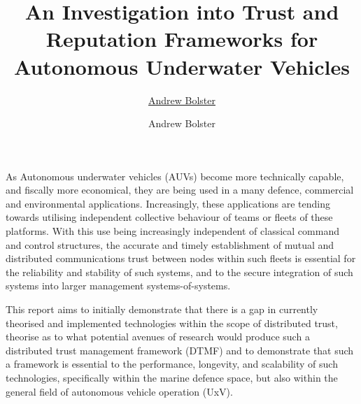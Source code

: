 \documentclass[twoside,10pt,a4paper]{Latex/Classes/PhDthesisPSnPDF}
\title{An Investigation into Trust and Reputation Frameworks for Autonomous Underwater Vehicles}
\author{\href{mailto:me@andrewbolster.info}{Andrew Bolster}}
\author{Andrew Bolster}
\begin{document}

\renewcommand\baselinestretch{1}



\maketitle  %



\begin{abstracts}        %
As Autonomous underwater vehicles (AUVs) become more technically capable, and
fiscally more economical, they are being used in a many defence, commercial and
environmental applications. Increasingly, these applications are tending towards
utilising  independent collective behaviour of teams or fleets of these
platforms. With this use being increasingly independent of classical command and
control structures, the accurate and timely establishment of mutual and
distributed communications trust between nodes within such fleets is essential
for the reliability and stability of such systems, and to the secure integration
of such systems into larger management systems-of-systems. 

This report aims to initially demonstrate that there is a gap in currently
theorised and implemented technologies within the scope of distributed trust,
theorise as to what potential avenues of research would produce such a
distributed trust management framework (DTMF) and to demonstrate that such a
framework is essential to the performance, longevity, and scalability of such
technologies, specifically within the marine defence space, but also within the
general field of autonomous vehicle operation (UxV). 
\end{abstracts}

%   
\end{document}
